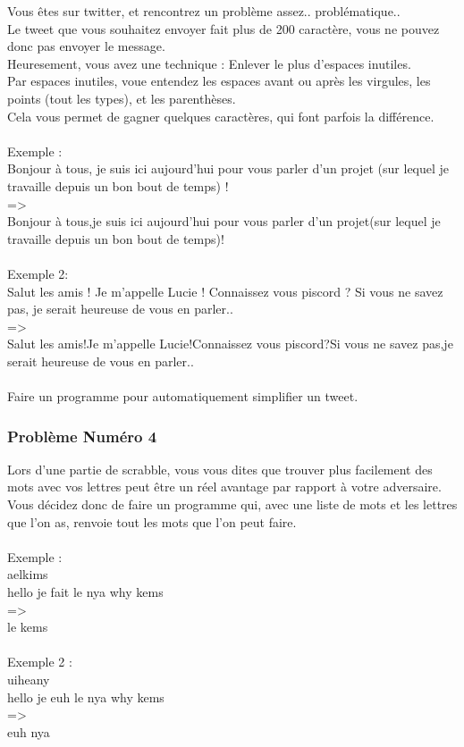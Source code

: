 \documentclass[12pt]{article}
\begin{document}
Vous êtes sur twitter, et rencontrez un problème assez.. problématique..\\
Le tweet que vous souhaitez envoyer fait plus de 200 caractère, vous ne pouvez donc pas envoyer le message.\\
Heuresement, vous avez une technique : Enlever le plus d'espaces inutiles.\\
Par espaces inutiles, voue entendez les espaces avant ou après les virgules, les points (tout les types), et les parenthèses.\\
Cela vous permet de gagner quelques caractères, qui font parfois la différence.
\\\\
Exemple :\\
Bonjour à tous, je suis ici aujourd'hui pour vous parler d'un projet (sur lequel je travaille depuis un bon bout de temps) !\\
=\textgreater\\
Bonjour à tous,je suis ici aujourd'hui pour vous parler d'un projet(sur lequel je travaille depuis un bon bout de temps)!
\\\\
Exemple 2:\\
Salut les amis ! Je m'appelle Lucie ! Connaissez vous piscord ? Si vous ne savez pas, je serait heureuse de vous en parler..\\
=\textgreater\\
Salut les amis!Je m'appelle Lucie!Connaissez vous piscord?Si vous ne savez pas,je serait heureuse de vous en parler..
\\\\
Faire un programme pour automatiquement simplifier un tweet.

\subsubsection{Problème Numéro 4}

Lors d'une partie de scrabble, vous vous dites que trouver plus facilement des mots avec vos lettres peut être un réel avantage par rapport à votre adversaire.\\
Vous décidez donc de faire un programme qui, avec une liste de mots et les lettres que l'on as, renvoie tout les mots que l'on peut faire.
\\\\
Exemple :\\
aelkims\\
hello je fait le nya why kems\\
=\textgreater\\
le kems
\\\\
Exemple 2 :\\
uiheany\\
hello je euh le nya why kems\\
=\textgreater\\
euh nya
\end{document}
